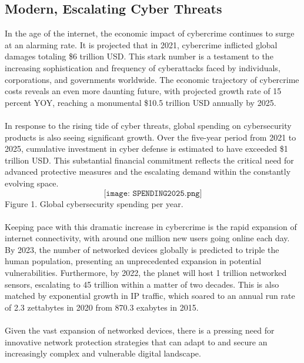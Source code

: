 \subsection{Modern, Escalating Cyber Threats}
In the age of the internet, the economic impact of cybercrime continues to surge at an alarming rate. It is projected that in 2021, cybercrime inflicted global damages totaling \$6 trillion USD. This stark number is a testament to the increasing sophistication and frequency of cyberattacks faced by individuals, corporations, and governments worldwide. The economic trajectory of cybercrime costs reveals an even more daunting future, with projected growth rate of 15 percent YOY, reaching a monumental \$10.5 trillion USD annually by 2025. \\
\\
In response to the rising tide of cyber threats, global spending on cybersecurity products is also seeing significant growth. Over the five-year period from 2021 to 2025, cumulative investment in cyber defense is estimated to have exceeded \$1 trillion USD. This substantial financial commitment reflects the critical need for advanced protective measures and the escalating demand within the constantly evolving space.
$$
\texttt{[image: SPENDING2025.png]}
$$
Figure 1. Global cybersecurity spending per year. 
\\ \\
Keeping pace with this dramatic increase in cybercrime is the rapid expansion of internet connectivity, with around one million new users going online each day. By 2023, the number of networked devices globally is predicted to triple the human population, presenting an unprecedented expansion in potential vulnerabilities. Furthermore, by 2022, the planet will host 1 trillion networked sensors, escalating to 45 trillion within a matter of two decades. This is also matched by exponential growth in IP traffic, which soared to an annual run rate of 2.3 zettabytes in 2020 from 870.3 exabytes in 2015. \\
\\
Given the vast expansion of networked devices, there is a pressing need for innovative network protection strategies that can adapt to and secure an increasingly complex and vulnerable digital landscape. 
